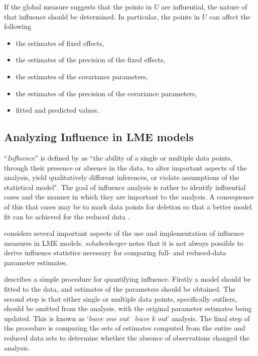 \documentclass[Main.tex]{subfiles}
\begin{document}
		If the global measure suggests that the points in $U$ are influential, the nature of that influence should be determined. In particular, the points in $U$ can affect the following
		
		\begin{itemize}
			\item the estimates of fixed effects,
			\item the estimates of the precision of the fixed effects,
			\item the estimates of the covariance parameters,
			\item the estimates of the precision of the covariance parameters,
			\item fitted and predicted values.
		\end{itemize}


				\subsection{Analyzing Influence in LME models}
				``\textit{Influence}” is defined by \citet{schab} as ``the ability of a single or multiple data points, through their presence
				or absence in the data, to alter important aspects of the analysis, yield qualitatively different inferences, or
				violate assumptions of the statistical model". The goal of influence analysis is rather to identify influential cases and the manner in
				which they are important to the analysis. A consequence of this that cases may be to mark data
				points for deletion so that a better model fit can be achieved for the reduced data \citep{schab}.  
				
				
				
				\citet{schab} considers several important aspects of the use and implementation of influence measures in LME models. \textit{schabenberger} notes that it is not always possible to
				derive influence statistics necessary for comparing full- and reduced-data parameter estimates. 
				
				\citet{schab} describes a simple procedure for quantifying influence. Firstly a model should be fitted to the data, and
				estimates of the parameters should be obtained. The second step is that either single or multiple data points, specifically outliers,
				should be omitted from the analysis, with the original parameter estimates being updated. This is known as `\textit{leave one out \ leave k out}' analysis. The final step of the procedure is comparing the 	sets of estimates computed from the entire and reduced data sets to determine whether the absence of observations changed the
				analysis.		
\end{document}
